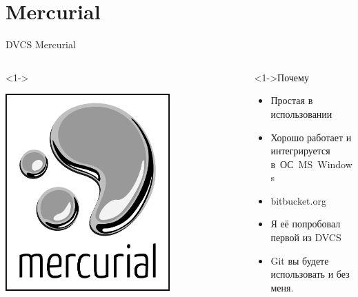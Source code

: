 \documentclass[pdf,9pt,aspectratio=169,xcolor={dvipsnames}]{beamer}
\begin{document}
\section{Mercurial}

\begin{frame}{DVCS Mercurial}
  \begin{columns}[T]
    \begin{column}[]{0.35\textwidth}  
      \begin{exampleblock}<1->{}
        \begin{center}
          \includegraphics[width=0.7\textwidth]{images/Mercurial_logo.png}
        \end{center}
      \end{exampleblock}
    \end{column}
    \begin{column}[]{0.55\textwidth}  
      \begin{block}<1->{Почему}
        \begin{itemize}
          \item Простая в использовании
          \item Хорошо работает и интегрируется в\ ОС~MS~Windows
          \item bitbucket.org
          \item Я её попробовал первой из DVCS
          \item Git вы будете использовать и без меня.
        \end{itemize}
      \end{block}
    \end{column}
  \end{columns}
  \vfill
\end{frame}
\end{document}
